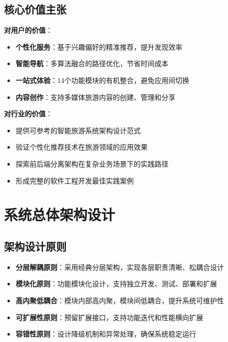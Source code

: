 \documentclass[12pt,a4paper]{article}
\begin{document}
\subsection{核心价值主张}

\textbf{对用户的价值}：
\begin{itemize}
    \item \textbf{个性化服务}：基于兴趣偏好的精准推荐，提升发现效率
    \item \textbf{智能导航}：多算法融合的路径优化，节省时间成本
    \item \textbf{一站式体验}：14个功能模块的有机整合，避免应用间切换
    \item \textbf{内容创作}：支持多媒体旅游内容的创建、管理和分享
\end{itemize}

\textbf{对行业的价值}：
\begin{itemize}
    \item 提供可参考的智能旅游系统架构设计范式
    \item 验证个性化推荐技术在旅游领域的应用效果
    \item 探索前后端分离架构在复杂业务场景下的实践路径
    \item 形成完整的软件工程开发最佳实践案例
\end{itemize}

\section{系统总体架构设计}

\subsection{架构设计原则}

\begin{warningbox}[title={架构设计核心原则}]
\begin{itemize}[nosep]
    \item \textbf{分层解耦原则}：采用经典分层架构，实现各层职责清晰、松耦合设计
    \item \textbf{模块化原则}：功能模块化设计，支持独立开发、测试、部署和扩展
    \item \textbf{高内聚低耦合}：模块内部高内聚，模块间低耦合，提升系统可维护性
    \item \textbf{可扩展性原则}：预留扩展接口，支持功能迭代和性能横向扩展
    \item \textbf{容错性原则}：设计降级机制和异常处理，确保系统稳定运行
\end{itemize}
\end{warningbox}
\end{document}
